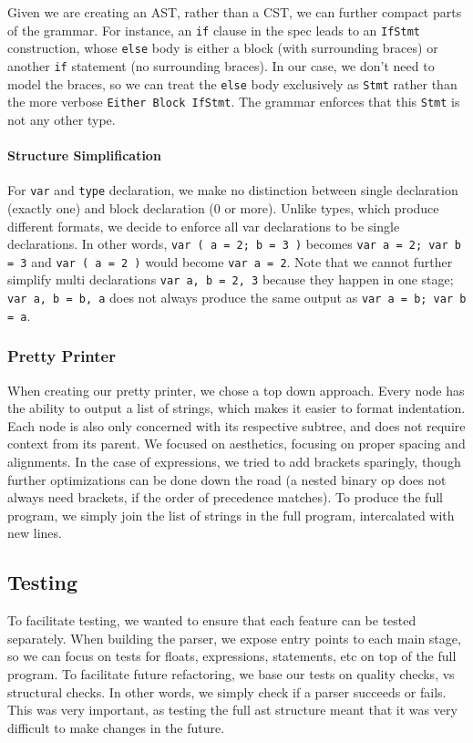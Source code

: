 \documentclass[11pt]{article}
\begin{document}
Given we are creating an AST, rather than a CST, we can further
compact parts of the grammar. For instance, an \texttt{if} clause in
the spec leads to an \texttt{IfStmt} construction, whose \texttt{else}
body is either a block (with surrounding braces) or another
\texttt{if} statement (no surrounding braces). In our case, we don't
need to model the braces, so we can treat the \texttt{else} body
exclusively as \texttt{Stmt} rather than the more verbose
\texttt{Either Block IfStmt}. The grammar enforces that this
\texttt{Stmt} is not any other type.
\paragraph{Structure Simplification}
For \texttt{var} and \texttt{type} declaration, we make no distinction
between single declaration (exactly one) and block declaration (0 or
more). Unlike types, which produce different formats, we decide to
enforce all var declarations to be single declarations. In other
words, \texttt{var ( a = 2; b = 3 )} becomes \texttt{var a = 2; var b = 3}
and \texttt{var ( a = 2 )} would become \texttt{var a = 2}. Note
that we cannot further simplify multi declarations \texttt{var a, b
  = 2, 3} because they happen in one stage;
  \texttt{var a, b = b, a} does not always produce the same output as
  \texttt{var a = b; var b = a}.

\subsubsection{Pretty Printer}
When creating our pretty printer, we chose a top down approach.  Every
node has the ability to output a list of strings, which makes it
easier to format indentation. Each node is also only concerned with
its respective subtree, and does not require context from its
parent. We focused on aesthetics, focusing on proper spacing and
alignments. In the case of expressions, we tried to add brackets
sparingly, though further optimizations can be done down the road (a
nested binary op does not always need brackets, if the order of
precedence matches). To produce the full program, we simply join the
list of strings in the full program, intercalated with new lines.

\subsection{Testing}

To facilitate testing, we wanted to ensure that each feature can
be tested separately.
When building the parser, we expose entry points to each main stage,
so we can focus on tests for floats, expressions, statements, etc
on top of the full program.
To facilitate future refactoring, we base our tests on quality checks, vs structural checks.
In other words, we simply check if a parser succeeds or fails.
This was very important, as testing the full ast structure meant that
it was very difficult to make changes in the future.
\end{document}
